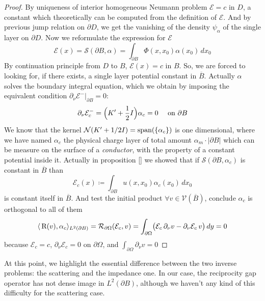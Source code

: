 \documentclass[10pt, a4paper, twoside, openright]{book}
\theoremstyle{definition}
\theoremstyle{plain}
\theoremstyle{plain}
\theoremstyle{plain}
\theoremstyle{plain}
\theoremstyle{plain}
\theoremstyle{plain}
\theoremstyle{plain}
\theoremstyle{plain}
\begin{document}
\begin{proof}
 By uniqueness of interior homogeneous Neumann problem $\mathcal{E} = c$ in $D$, a constant which theoretically can be computed from the definition of $\mathcal{E}$. And by previous jump relation on $\partial D$, we get the vanishing of the density $\psi_\alpha$ of the single layer on $\partial D$. Now we reformulate the expression for $\mathcal{E}$
 \begin{equation}
  \mathcal{E}(x)= \mathcal{S}(\partial B, \alpha) = \int_{\partial B}\Phi(x,x_0)\alpha(x_0)\, dx_0
 \end{equation}
 By continuation principle from $D$ to $B$, $\mathcal{E}(x)=c$ in $B$. So, we are forced to looking for, if there exists, a single layer potential constant in $\overline{B}$. 
 Actually $\alpha$ solves the boundary integral equation, which we obtain by imposing the equivalent condition $\partial_\nu\mathcal{E}^-|_{\partial B}=0$:
 \begin{equation}
  \partial_\nu\mathcal{E}_{c}^-=\Bigl(K'+\dfrac{1}{2}I\Bigr)\alpha_{c}= 0\quad\textup{ on }\partial B
 \end{equation}
 We know that the kernel $\mathcal{N}(K' + 1/2 I)=\textup{span}(\{\alpha_{c}\})$ is one dimensional, where we have named $\alpha_{c}$ the physical charge layer of total amount $\alpha_m \cdot |\partial B|$  which can be measure on the surface of a \emph{conductor}, with the property of a constant potential inside it.
Actually in proposition \ref{} we showed that if $\mathcal{S}(\partial B, \alpha_{c})$ is constant in $\overline{B}$ than
\begin{equation}
 \mathcal{E}_{c}(x)\coloneqq\int_{\partial B}u(x,x_0)\alpha_{c}(x_0)\,dx_0\label{eq:definition-E-pc}
\end{equation}
is constant itself in $\overline{B}$. And test the initial product $\forall v\in\mathcal{V}(\overline{B})$, conclude $\alpha_{c}$ is orthogonal to all of them
\begin{equation}
 \langle \, \textup{R}(v) ,\alpha_{c}\rangle_{L^2(\partial B)}=\mathcal{R}_{\partial \Omega}(\mathcal{E}_{c}, v)=\int_{\partial\Omega}\bigl(\mathcal{E}_{c}\,\partial_\nu v - \partial_\nu\mathcal{E}_{c}\, v\bigr)\,dy=0
\end{equation}
because $\mathcal{E}_{c}=c$, $\partial_\nu\mathcal{E}_{c}=0$ on $\partial\Omega$, and $\int_{\partial\Omega}\partial_\nu v=0$
\end{proof}
At this point, we highlight the essential difference between the two inverse problems: the scattering and the impedance one. In our case, the reciprocity gap operator has not dense image in $L^2(\partial B)$, although we haven't any kind of this difficulty for the scattering case.
\end{document}
